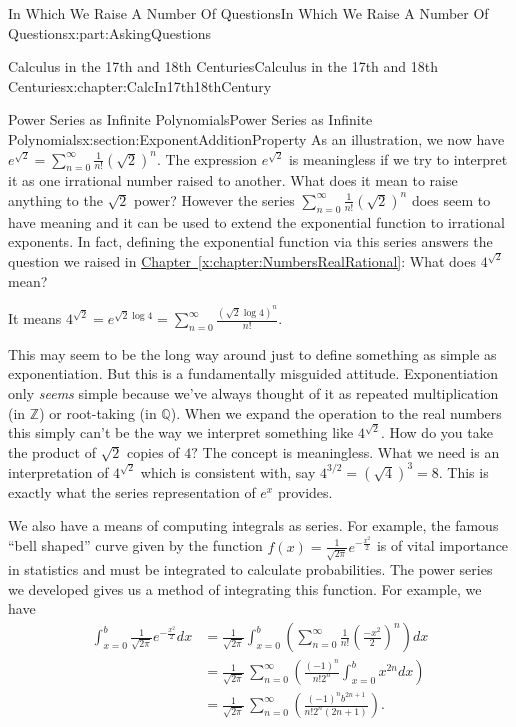 \documentclass[oneside,10pt,]{book}
\newcommand{\xreffont}{\relax}
\numberwithin{equation}{section}
\newcommand{\QQ}{\mathbb {Q}}
\newcommand{\ZZ}{\mathbb {Z}}
\newcommand{\amp}{&}
\begin{document}
\begin{partptx}{In Which We Raise A Number Of Questions}{}{In Which We Raise A Number Of Questions}{}{}{x:part:AskingQuestions}
\begin{chapterptx}{Calculus in the 17th and 18th Centuries}{}{Calculus in the 17th and 18th Centuries}{}{}{x:chapter:CalcIn17th18thCentury}
\begin{sectionptx}{Power Series as Infinite Polynomials}{}{Power Series as Infinite Polynomials}{}{}{x:section:ExponentAdditionProperty}
As an illustration, we now have \(e^{\sqrt{2}}=\sum_{n=0}^\infty\frac{1}{n!}\left(\sqrt{2}\right)^n\). The expression \(e^{\sqrt{2}}\) is meaningless if we try to interpret it as one irrational number raised to another. What does it mean to raise anything to the \(\sqrt{2}\) power? However the series \(\sum_{n=0}^\infty\frac{1}{n!}\left(\sqrt{2}\right)^n\) does seem to have meaning and it can be used to extend the exponential function to irrational exponents. In fact, defining the exponential function via this series answers the question we raised in  \hyperref[x:chapter:NumbersRealRational]{Chapter~{\xreffont\ref{x:chapter:NumbersRealRational}}}: What does \(4^{\sqrt{2}}\) mean?%
\par
It means \(\displaystyle 4^{\sqrt{2}} = e^{\sqrt{2}\log 4} = \sum_{n=0}^\infty\frac{(\sqrt{2}\log 4)^n}{n!}\).%
\par
This may seem to be the long way around just to define something as simple as exponentiation. But this is a fundamentally misguided attitude. Exponentiation only \emph{seems} simple because we've always thought of it as repeated multiplication (in \(\ZZ\)) or root-taking (in \(\QQ\)). When we expand the operation to the real numbers this simply can't be the way we interpret something like \(4^{\sqrt{2}}\). How do you take the product of \(\sqrt{2}\) copies of \(4?\) The concept is meaningless. What we need is an interpretation of \(4^{\sqrt{2}}\) which is consistent with, say \(4^{3/2} = \left(\sqrt{4}\right)^3=8\). This is exactly what the series representation of \(e^x\) provides.%
\par
We also have a means of computing integrals as series. For example, the famous ``bell shaped'' curve given by the function \(f(x)=\frac{1}{\sqrt{2\pi}}e^{-\frac{x^2}{2}}\) is of vital importance in statistics and must be integrated to calculate probabilities. The power series we developed gives us a method of integrating this function. For example, we have%
\begin{align*}
\int_{x=0}^b\frac{1}{\sqrt{2\pi}}e^{-\frac{x^2}{2}}d x \amp  =\frac{1}{\sqrt{2\pi}}\int_{x=0}^b\left(\sum_{n=0}^\infty\frac{1}{n!}\left(\frac{-x^2}{2}\right)^n\right)d x\\
\amp =\frac{1}{\sqrt{2\pi}}\,\sum_{n=0}^\infty\left(\frac{\left(-1\right)^n}{n!2^n}\int_{x=0}^bx^{2n}d x\right)\\
\amp =\frac{1}{\sqrt{2\pi}}\,\sum_{n=0}^\infty\left(\frac{\left(-1\right)^nb^{2n+1}}{n!2^n\left(2n+1\right)}\right)\text{.}
\end{align*}
%
\par

\end{sectionptx}
\end{chapterptx}
\end{partptx}
\end{document}
